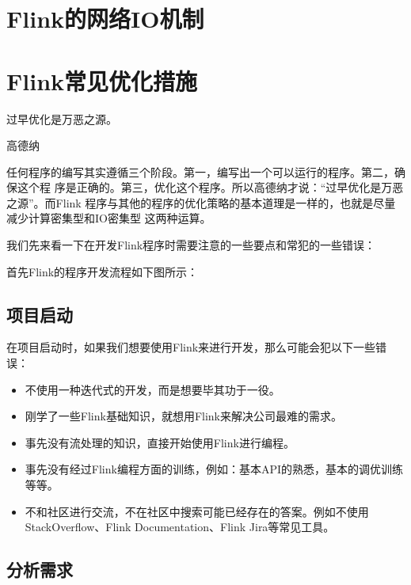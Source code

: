 \documentclass[cn,11pt,chinese]{elegantbook}
\begin{document}
\chapter{Flink的网络IO机制}

\chapter{Flink常见优化措施}

\epigraph{过早优化是万恶之源。}{高德纳}

任何程序的编写其实遵循三个阶段。第一，编写出一个可以运行的程序。第二，确保这个程
序是正确的。第三，优化这个程序。所以高德纳才说：“过早优化是万恶之源”。而Flink
程序与其他的程序的优化策略的基本道理是一样的，也就是尽量减少计算密集型和IO密集型
这两种运算。

我们先来看一下在开发Flink程序时需要注意的一些要点和常犯的一些错误：

首先Flink的程序开发流程如下图所示：


\section{项目启动}

在项目启动时，如果我们想要使用Flink来进行开发，那么可能会犯以下一些错误：

\begin{itemize}
\item 不使用一种迭代式的开发，而是想要毕其功于一役。
\item 刚学了一些Flink基础知识，就想用Flink来解决公司最难的需求。
\item 事先没有流处理的知识，直接开始使用Flink进行编程。
\item 事先没有经过Flink编程方面的训练，例如：基本API的熟悉，基本的调优训练等等。
\item 不和社区进行交流，不在社区中搜索可能已经存在的答案。例如不使用
  StackOverflow、Flink Documentation、Flink Jira等常见工具。
\end{itemize}

\section{分析需求}
\end{document}
